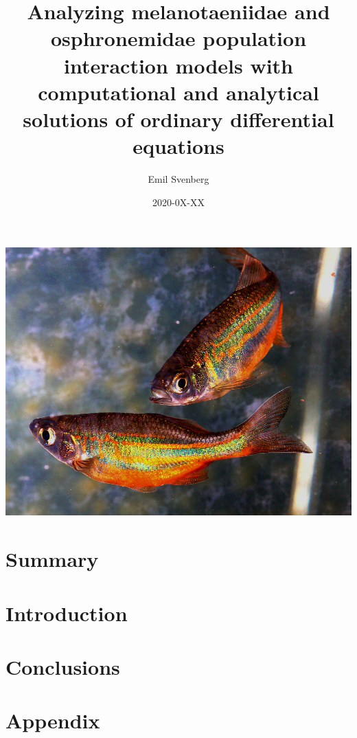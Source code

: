 \documentclass{article}
\title{Analyzing melanotaeniidae and osphronemidae population interaction models with computational 
and analytical solutions of ordinary differential equations}
\author{Emil Svenberg}
\date{2020-0X-XX}
\begin{document}
\maketitle
\begin{center}
    \includegraphics[scale=0.3]{../figures/rainbowfish.jpg}
\end{center}
\pagebreak
\tableofcontents
\pagebreak
\section*{Summary}


\section{Introduction}



\section{Conclusions}

\section{Appendix}
\end{document}
